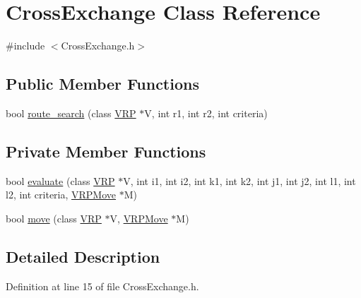 \hypertarget{class_cross_exchange}{
\section{CrossExchange Class Reference}
\label{class_cross_exchange}
}


{\ttfamily \#include $<$CrossExchange.h$>$}

\subsection*{Public Member Functions}
\begin{DoxyCompactItemize}
\item 
bool \hyperlink{class_cross_exchange_a859a07cdeb05688f0e80d14892ba4ca0}{route\_\-search} (class \hyperlink{class_v_r_p}{VRP} $\ast$V, int r1, int r2, int criteria)
\end{DoxyCompactItemize}
\subsection*{Private Member Functions}
\begin{DoxyCompactItemize}
\item 
bool \hyperlink{class_cross_exchange_afbac0c51fb4e73f0ec16791116c316f1}{evaluate} (class \hyperlink{class_v_r_p}{VRP} $\ast$V, int i1, int i2, int k1, int k2, int j1, int j2, int l1, int l2, int criteria, \hyperlink{class_v_r_p_move}{VRPMove} $\ast$M)
\item 
bool \hyperlink{class_cross_exchange_a9dde3890639999e28ab17ab43c1a86d0}{move} (class \hyperlink{class_v_r_p}{VRP} $\ast$V, \hyperlink{class_v_r_p_move}{VRPMove} $\ast$M)
\end{DoxyCompactItemize}


\subsection{Detailed Description}


Definition at line 15 of file CrossExchange.h.




